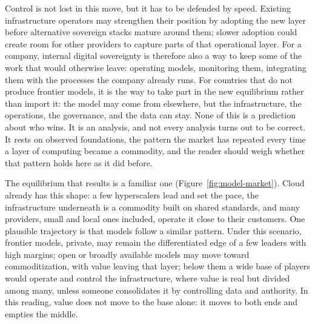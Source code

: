 \documentclass[10pt,oneside,openany]{book}
\begin{document}
Control is not lost in this move, but it has to be defended by speed. Existing infrastructure operators may strengthen their position by adopting the new layer before alternative sovereign stacks mature around them; slower adoption could create room for other providers to capture parts of that operational layer. For a company, internal digital sovereignty is therefore also a way to keep some of the work that would otherwise leave: operating models, monitoring them, integrating them with the processes the company already runs. For countries that do not produce frontier models, it is the way to take part in the new equilibrium rather than import it: the model may come from elsewhere, but the infrastructure, the operations, the governance, and the data can stay. None of this is a prediction about who wins. It is an analysis, and not every analysis turns out to be correct. It rests on observed foundations, the pattern the market has repeated every time a layer of computing became a commodity, and the reader should weigh whether that pattern holds here as it did before.

The equilibrium that results is a familiar one (Figure~\ref{fig:model-market}). Cloud already has this shape: a few hyperscalers lead and set the pace, the infrastructure underneath is a commodity built on shared standards, and many providers, small and local ones included, operate it close to their customers. One plausible trajectory is that models follow a similar pattern. Under this scenario, frontier models, private, may remain the differentiated edge of a few leaders with high margins; open or broadly available models may move toward commoditization, with value leaving that layer; below them a wide base of players would operate and control the infrastructure, where value is real but divided among many, unless someone consolidates it by controlling data and authority. In this reading, value does not move to the base alone: it moves to both ends and empties the middle.
\end{document}
